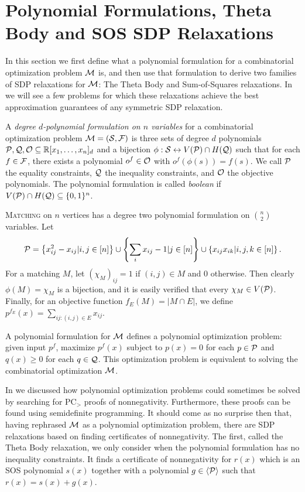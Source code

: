 \section{Polynomial Formulations, Theta Body and SOS SDP Relaxations}\label{sec:polyforms}
In this section we first define what a polynomial formulation for a combinatorial optimization problem $\mathcal M$ is, and then use that formulation to derive two families of SDP relaxations for $\mathcal M$: The Theta Body and Sum-of-Squares relaxations. In  we will see a few problems for which these relaxations achieve the best approximation guarantees of any symmetric SDP relaxation. 
\begin{definition}
A \emph{degree $d$-polynomial formulation on $n$ variables} for a combinatorial optimization problem $\mathcal M = (\mathcal S, \mathcal F)$ is three sets of degree $d$ polynomials $\mathcal P,\mathcal Q,\mathcal O \subseteq \mathbb R[x_1,\dots,x_n]_d$ and a bijection $\phi: \mathcal S \leftrightarrow V(\mathcal P) \cap H(\mathcal Q)$ such that for each $f \in \mathcal F$, there exists a polynomial $o^f \in \mathcal O$ with $o^f(\phi(s)) = f(s)$. We call $\mathcal P$ the equality constraints, $\mathcal Q$ the inequality constraints, and $\mathcal O$ the objective polynomials. The polynomial formulation is called \emph{boolean} if $V(\mathcal P) \cap H(\mathcal Q) \subseteq \{0,1\}^n$. 
\end{definition}
\begin{example}
\textsc{Matching} on $n$ vertices has a degree two polynomial formulation on $\binom{n}{2}$ variables. Let 
\[\mathcal P = \left\{x_{ij}^2 - x_{ij} | i,j \in [n]\right\} \cup \left\{\sum_i x_{ij} - 1 | j \in [n]\right\} \cup \left\{x_{ij}x_{ik} | i,j,k \in [n]\right\}.\] 
For a matching $M$, let $(\chi_M)_{ij} = 1$ if $(i,j) \in M$ and $0$ otherwise. Then clearly $\phi(M) = \chi_M$ is a bijection, and it is easily verified that every $\chi_M \in V(\mathcal P)$. Finally, for an objective function $f_E(M) = |M \cap E|$, we define $p^{f_E}(x) = \sum_{ij: (i,j) \in E} x_{ij}$. 
\end{example}
A polynomial formulation for $\mathcal M$ defines a polynomial optimization problem: given input $p^f$, maximize $p^f(x)$ subject to $p(x) = 0$ for each $p \in \mathcal P$ and $q(x) \geq 0$ for each $q \in \mathcal Q$. This optimization problem is equivalent to solving the combinatorial optimization $\mathcal M$. 

In  we discussed how polynomial optimization problems could sometimes be solved by searching for PC$_>$ proofs of nonnegativity. Furthermore, these proofs can be found using semidefinite programming. It should come as no surprise then that, having rephrased $\mathcal M$ as a polynomial optimization problem, there are SDP relaxations based on finding certificates of nonnegativity. The first, called the Theta Body relaxation, we only consider when the polynomial formulation has no inequality constraints. It finds a certificate of nonnegativity for $r(x)$ which is an SOS polynomial $s(x)$ together with a polynomial $g \in \langle \mathcal P \rangle$ such that $r(x) = s(x) + g(x)$. 

